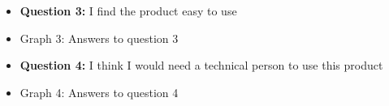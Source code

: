 \documentclass{article}
\begin{document}
\begin{itemize}
		\item[] \textbf{Question 3:} I find the product easy to use
		\item[] \begin{minipage}[t]{\linewidth}
         	 \raggedright
          	\medskip
          	\centerline{Graph 3: Answers to question 3}
          \end{minipage}
\end{itemize}
\newpage
\begin{itemize}
		\item[] \textbf{Question 4:} I think I would need a technical person to use this product
		\item[] \begin{minipage}[t]{\linewidth}
         	 \raggedright
          	\medskip
          	\centerline{Graph 4: Answers to question 4}
          \end{minipage}
\end{itemize}
\end{document}
